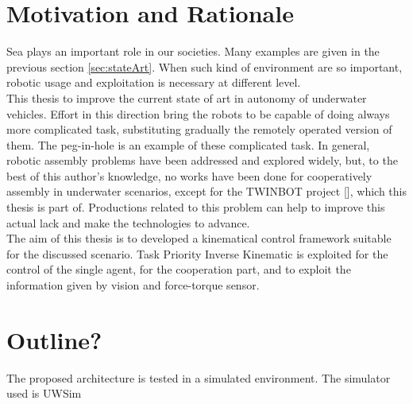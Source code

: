 \section{Motivation and Rationale}
Sea plays an important role in our societies. Many examples are given in the previous section \ref{sec:stateArt}. When such kind of environment are so important, robotic usage and exploitation is necessary at different level.\\
This thesis to improve the current state of art in autonomy of underwater vehicles. Effort in this direction bring the robots to be capable of doing always more complicated task, substituting gradually the remotely operated version of them. The peg-in-hole is an example of these complicated task. In general, robotic assembly problems have been addressed and explored widely, but, to the best of this author's knowledge, no works have been done for cooperatively assembly in underwater scenarios, except for the TWINBOT project [\cite{TWINBOT2019}], which this thesis is part of. Productions related to this problem can help to improve this actual lack and make the technologies to advance.\\

The aim of this thesis is to developed a kinematical control framework suitable for the discussed scenario. Task Priority Inverse Kinematic is exploited for the control of the single agent, for the cooperation part, and to exploit the information given by vision and force-torque sensor. 

\section{Outline?}
The proposed architecture is tested in a simulated environment. The simulator used is UWSim







